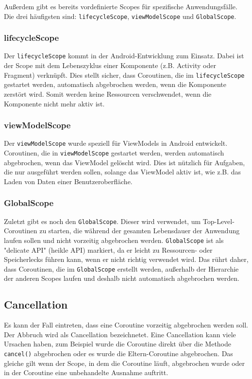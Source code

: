 \documentclass[fontsize=12pt,paper=a4,twoside=semi,parskip=half-,headsepline,headinclude]{scrreprt}
\begin{document}
Außerdem gibt es bereits vordefinierte Scopes für spezifische Anwendungsfälle. Die drei häufigsten sind: \texttt{lifecycleScope}, \texttt{viewModelScope} und \texttt{GlobalScope}.

\subsubsection{lifecycleScope}

Der \texttt{lifecycleScope} kommt in der Android-Entwicklung zum Einsatz. Dabei ist der Scope mit dem Lebenszyklus einer Komponente (z.B. Activity oder Fragment) verknüpft. Dies stellt sicher, dass Coroutinen, die im \texttt{lifecycleScope} gestartet werden, automatisch abgebrochen werden, wenn die Komponente zerstört wird. Somit werden keine Ressourcen verschwendet, wenn die Komponente nicht mehr aktiv ist.

\subsubsection{viewModelScope}

Der \texttt{viewModelScope} wurde speziell für ViewModels in Android entwickelt. Coroutinen, die in \texttt{viewModelScope} gestartet werden, werden automatisch abgebrochen, wenn das ViewModel gelöscht wird. Dies ist nützlich für Aufgaben, die nur ausgeführt werden sollen, solange das ViewModel aktiv ist, wie z.B. das Laden von Daten einer Benutzer\-oberfläche.

\subsubsection{GlobalScope}

Zuletzt gibt es noch den \texttt{GlobalScope}. Dieser wird verwendet, um Top-Level-Coroutinen zu starten, die während der gesamten Lebensdauer der Anwendung laufen sollen und nicht vorzeitig abgebrochen werden. \texttt{GlobalScope} ist als "delicate API" (heikle API) markiert, da er leicht zu Ressourcen- oder Speicherlecks führen kann, wenn er nicht richtig verwendet wird. Das rührt daher, dass Coroutinen, die im \texttt{GlobalScope} erstellt werden, außerhalb der Hierarchie der anderen Scopes laufen und deshalb nicht automatisch abgebrochen werden.

\subsection{Cancellation}

Es kann der Fall eintreten, dass eine Coroutine vorzeitig abgebrochen werden soll. Der Abbruch wird als Cancellation bezeichnetet. Eine Cancellation kann viele Ursachen haben, zum Beispiel wurde die Coroutine direkt über die Methode \texttt{cancel()} abgebrochen oder es wurde die Eltern-Coroutine abgebrochen. Das gleiche gilt wenn der Scope, in dem die Coroutine läuft, abgebrochen wurde oder in der Coroutine eine unbehandelte Ausnahme auftritt.
\end{document}
